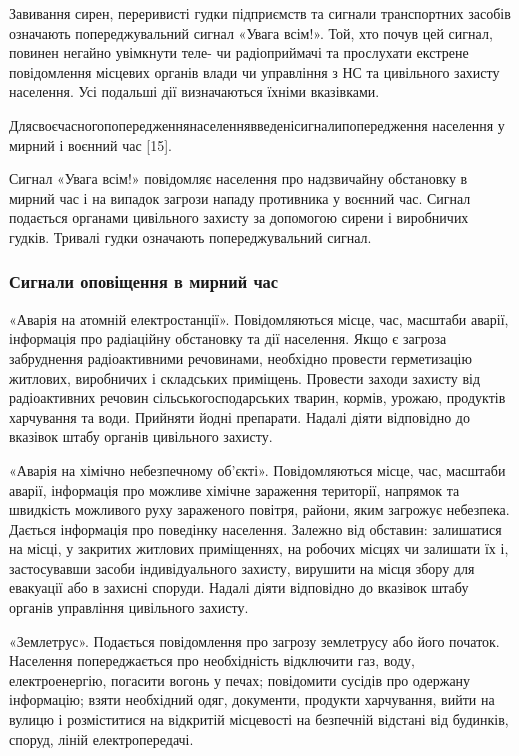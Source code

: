 Завивання сирен, переривисті гудки підприємств та сигнали транспортних засобів означають попереджувальний сигнал «Увага всім!». Той, хто почув цей сигнал, повинен негайно увімкнути теле- чи радіоприймачі та прослухати екстрене повідомлення місцевих органів влади чи управління з НС та цивільного захисту населення. Усі подальші дії визначаються їхніми вказівками.

Для\hfill своєчасного\hfill попередження\hfill населення\hfill введені\hfill сигнали\newline попередження населення у мирний і воєнний час [15].

Сигнал «Увага всім!» повідомляє населення про надзвичайну обстановку в мирний час і на випадок загрози нападу противника у воєнний час. Сигнал подається органами цивільного захисту за допомогою сирени і виробничих гудків. Тривалі гудки означають попереджувальний сигнал.

\subsubsection{Сигнали оповіщення в мирний час}

«Аварія на атомній електростанції». Повідомляються місце, час, масштаби аварії, інформація про радіаційну обстановку та дії населення. Якщо є загроза забруднення радіоактивними речовинами, необхідно провести герметизацію житлових, виробничих і складських приміщень. Провести заходи захисту від радіоактивних речовин сільськогосподарських тварин, кормів, урожаю, продуктів харчування та води. Прийняти йодні препарати. Надалі діяти відповідно до вказівок штабу органів цивільного захисту.

«Аварія на хімічно небезпечному об'єкті». Повідомляються місце, час, масштаби аварії, інформація про можливе хімічне зараження території, напрямок та швидкість можливого руху зараженого повітря, райони, яким загрожує небезпека. Дається інформація про поведінку населення. Залежно від обставин: залишатися на місці, у закритих житлових приміщеннях, на робочих місцях чи залишати їх і, застосувавши засоби індивідуального захисту, вирушити на місця збору для евакуації або в захисні споруди. Надалі діяти відповідно до вказівок штабу органів управління цивільного захисту.

«Землетрус». Подається повідомлення про загрозу землетрусу або його початок. Населення попереджається про необхідність відключити газ, воду, електроенергію, погасити вогонь у печах; повідомити сусідів про одержану інформацію; взяти необхідний одяг, документи, продукти харчування, вийти на вулицю і розміститися на відкритій місцевості на безпечній відстані від будинків, споруд, ліній електропередачі.

